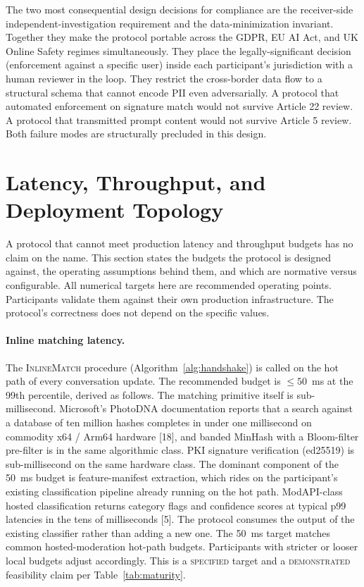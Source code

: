 \documentclass[11pt]{article}
\begin{document}
The two most consequential design decisions for compliance are the receiver-side independent-investigation requirement and the data-minimization invariant. Together they make the protocol portable across the GDPR, EU AI Act, and UK Online Safety regimes simultaneously. They place the legally-significant decision (enforcement against a specific user) inside each participant's jurisdiction with a human reviewer in the loop. They restrict the cross-border data flow to a structural schema that cannot encode PII even adversarially. A protocol that automated enforcement on signature match would not survive Article 22 review. A protocol that transmitted prompt content would not survive Article 5 review. Both failure modes are structurally precluded in this design.

\section{Latency, Throughput, and Deployment Topology}
\label{sec:deploy}

A protocol that cannot meet production latency and throughput budgets has no claim on the name. This section states the budgets the protocol is designed against, the operating assumptions behind them, and which are normative versus configurable. All numerical targets here are recommended operating points. Participants validate them against their own production infrastructure. The protocol's correctness does not depend on the specific values.

\paragraph{Inline matching latency.} The \textsc{InlineMatch} procedure (Algorithm~\ref{alg:handshake}) is called on the hot path of every conversation update. The recommended budget is $\leq 50$~ms at the 99th percentile, derived as follows. The matching primitive itself is sub-millisecond. Microsoft's PhotoDNA documentation reports that a search against a database of ten million hashes completes in under one millisecond on commodity x64 / Arm64 hardware [18], and banded MinHash with a Bloom-filter pre-filter is in the same algorithmic class. PKI signature verification (ed25519) is sub-millisecond on the same hardware class. The dominant component of the 50~ms budget is feature-manifest extraction, which rides on the participant's existing classification pipeline already running on the hot path. ModAPI-class hosted classification returns category flags and confidence scores at typical p99 latencies in the tens of milliseconds [5]. The protocol consumes the output of the existing classifier rather than adding a new one. The 50~ms target matches common hosted-moderation hot-path budgets. Participants with stricter or looser local budgets adjust accordingly. This is a \textsc{specified} target and a \textsc{demonstrated} feasibility claim per Table~\ref{tab:maturity}.
\end{document}
